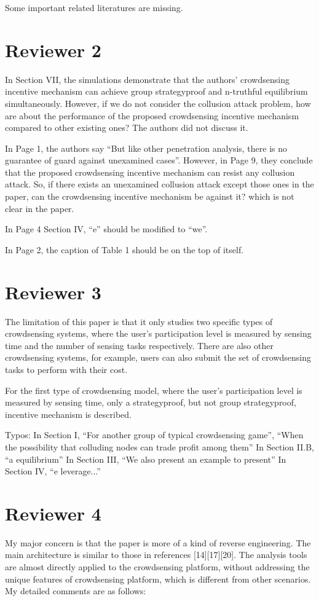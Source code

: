 \documentclass[a4paper,11pt]{exam}
\begin{document}
\begin{questions}
\question Some important related literatures are missing.

\section{Reviewer 2}
\question In Section VII, the simulations demonstrate that the authors’ crowdsensing incentive mechanism can achieve group strategyproof and n-truthful equilibrium simultaneously. However, if we do not consider the collusion attack problem, how are about the performance of the proposed crowdsensing incentive mechanism compared to other existing ones? The authors did not discuss it.  

\question In Page 1, the authors say “But like other penetration analysis, there is no guarantee of guard against unexamined cases”. However, in Page 9, they conclude that the proposed crowdsensing incentive mechanism can resist any collusion attack. So, if there exists an unexamined collusion attack except those ones in the paper, can the  crowdsensing incentive mechanism be against it?  which is not clear in the paper.

\question In Page 4 Section IV, “e” should be modified to “we”.

\question In Page 2, the caption of Table 1  should be on the top of itself.

\section{Reviewer 3}
\question The limitation of this paper is that it only studies two specific types of crowdsensing systems, where the user's participation level is measured by sensing time and the number of sensing tasks respectively. There are also other crowdsensing systems, for example, users can also submit the set of crowdsensing tasks to perform with their cost.

\question For the first type of crowdsensing model, where the user's participation level is measured by sensing time, only a strategyproof, but not group strategyproof, incentive mechanism is described.

\question Typos: 
In Section I, ``For another group of typical crowdsensing game'', ``When the possibility that colluding nodes can trade profit among them''
In Section II.B, ``a equilibrium''
In Section III, ``We also present an example to present''
In Section IV, ``e leverage...''

\section{Reviewer 4}
\question My major concern is that the paper is more of a kind of reverse engineering. The main architecture is similar to those in references [14][17][20]. The analysis tools are almost directly applied to the crowdsensing platform, without addressing the unique features of crowdsensing platform, which is different from other scenarios. My detailed comments are as follows:


\end{questions}
\end{document}
